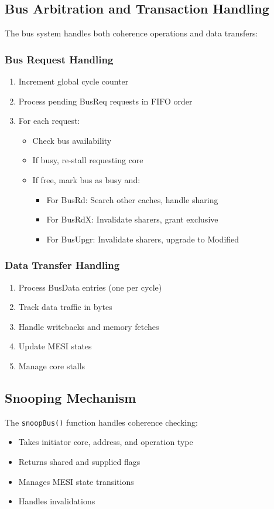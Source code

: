 \documentclass{article}
\begin{document}
\subsection{Bus Arbitration and Transaction Handling}
The bus system handles both coherence operations and data transfers:

\subsubsection{Bus Request Handling}
\begin{enumerate}
    \item Increment global cycle counter
    \item Process pending BusReq requests in FIFO order
    \item For each request:
    \begin{itemize}
        \item Check bus availability
        \item If busy, re-stall requesting core
        \item If free, mark bus as busy and:
        \begin{itemize}
            \item For BusRd: Search other caches, handle sharing
            \item For BusRdX: Invalidate sharers, grant exclusive
            \item For BusUpgr: Invalidate sharers, upgrade to Modified
        \end{itemize}
    \end{itemize}
\end{enumerate}

\subsubsection{Data Transfer Handling}
\begin{enumerate}
    \item Process BusData entries (one per cycle)
    \item Track data traffic in bytes
    \item Handle writebacks and memory fetches
    \item Update MESI states
    \item Manage core stalls
\end{enumerate}

\subsection{Snooping Mechanism}
The \texttt{snoopBus()} function handles coherence checking:
\begin{itemize}
    \item Takes initiator core, address, and operation type
    \item Returns shared and supplied flags
    \item Manages MESI state transitions
    \item Handles invalidations
\end{itemize}
\end{document}
